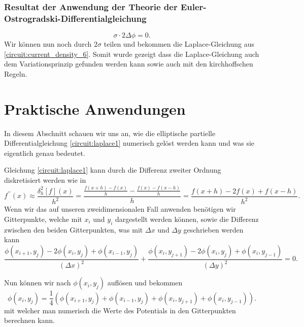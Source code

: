 \subsubsection{Resultat der Anwendung der Theorie der Euler-Ostrogradski-Differentialgleichung}
	\begin{equation}
	\sigma \cdot 2\Delta\phi=0.
	\end{equation}
Wir können nun noch durch $2\sigma$ teilen und bekommen die Laplace-Gleichung aus \eqref{circuit:current_density_6}. Somit wurde gezeigt dass die Laplace-Gleichung auch dem Variationsprinzip gefunden werden kann sowie auch mit den kirchhoffschen Regeln.


\section{Praktische Anwendungen}
In diesem Abschnitt schauen wir uns an, wie die elliptische partielle Differentialgleichung \eqref{circuit:laplace1} numerisch gelöst werden kann und was sie eigentlich genau bedeutet. 

Gleichung \eqref{circuit:laplace1} kann durch die Differenz zweiter Ordnung diskretisiert werden wie in 
\begin{equation}
	f^{\prime \prime}(x) \approx \frac{\delta_h^2[f](x)}{h^2}=\frac{\frac{f(x+h)-f(x)}{h}-\frac{f(x)-f(x-h)}{h}}{h}=\frac{f(x+h)-2 f(x)+f(x-h)}{h^2}.
	\label{circuit:second-order-central}
\end{equation}
\cite{enwiki:1220817436}
Wenn wir das auf unseren zweidimensionalen Fall anwenden benötigen wir Gitterpunkte, welche mit $x_i$ und $y_i$ dargestellt werden können, sowie die Differenz zwischen den beiden Gitterpunkten, was mit $\Delta x$ und $\Delta y$ geschrieben werden kann
\begin{equation}
	\frac{\phi(x_{i+1}, y_j) - 2\phi(x_i, y_j) + \phi(x_{i-1}, y_j)}{(\Delta x)^2} + \frac{\phi(x_i, y_{j+1}) - 2\phi(x_i, y_j) + \phi(x_i, y_{j-1})}{(\Delta y)^2} = 0.
	\label{circuit:discret_equation}
\end{equation}

Nun können wir nach $\phi(x_i, y_j)$ auflösen und bekommen 
\begin{equation}
	\phi(x_i, y_j) = \frac{1}{4}(\phi(x_{i+1}, y_{j}) + \phi(x_{i-1}, y_{j}) + \phi(x_{i}, y_{j+1}) + \phi(x_{i}, y_{j-1})).
	\label{circuit:discret_equation2}
\end{equation}
mit welcher man numerisch die Werte des Potentials in den Gitterpunkten berechnen kann.
